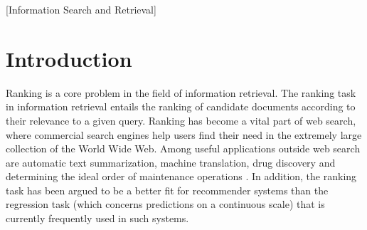 \documentclass{sig-alternate}
\begin{document}
\maketitle
\begin{abstract}
Learning to rank is an increasingly important scientific field that comprises the use of machine learning for the ranking task. New learning to rank methods are generally evaluated on benchmark test collections. However, comparison of learning to rank methods based on evaluation results is hindered by non-existence of a standard set of evaluation benchmark collections. In this paper we propose a way to compare learning to rank methods based on a sparse set of evaluation results on a set of benchmark datasets. Our comparison methodology consists of two components: 1) Normalized Winning Number, which gives insight in the ranking accuracy of the learning to rank method, and 2) Ideal Winning Number, which gives insight in the degree of certainty concerning its ranking accuracy. Evaluation results of 87 learning to rank methods on 20 well-known benchmark datasets are collected through a structured literature search. ListNet, SmoothRank, FenchelRank, FSMRank, LRUF and LARF are the best performing learning to rank methods in increasing order of Normalized Winning Number and decreasing order of Ideal Winning Number.
\end{abstract}

[Information Search and Retrieval]


\section{Introduction}
Ranking is a core problem in the field of information retrieval. The ranking task in information retrieval entails the ranking of candidate documents according to their relevance to a given query. Ranking has become a vital part of web search, where commercial search engines help users find their need in the extremely large collection of the World Wide Web. Among useful applications outside web search are automatic text summarization, machine translation, drug discovery and determining the ideal order of maintenance operations \cite{Rudin2009}. In addition, the ranking task has been argued to be a better fit for recommender systems than the regression task \cite{McNee2006} (which concerns predictions on a continuous scale) that is currently frequently used in such systems.\\
\end{document}
